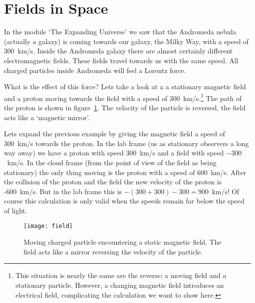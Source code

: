 \section{Fields in Space}
In the module `The Expanding Universe' we saw that the Andromeda nebula (actually a galaxy) is coming towards our galaxy, the Milky Way, with a speed of 300~km/s. Inside the Andromeda galaxy there are almost certainly different electromagnetic fields. These fields travel towards us with the same speed. All charged particles inside Andromeda will feel a Lorentz force.

What is the effect of this force? Lets take a look at a a stationary magnetic field and a proton moving towards the field with a speed of 300~km/s.\footnote{This situation is nearly the same are the reverse; a moving field and a stationary particle. However, a changing magnetic field introduces an electrical field, complicating the calculation we want to show here.} The path of the proton is shown in figure~\ref{fig:field}. The velocity of the particle is reversed, the field acts like a `magnetic mirror'.

Lets expand the previous example by giving the magnetic field a speed of 300~km/s towards the proton. In the lab frame (us as stationary observers a long way away) we have a proton with speed 300~km/s and a field with speed $-300$~km/s. In the cloud frame (from the point of view of the field as being stationary) the only thing moving is the proton with a speed of 600~km/s. After the collision of the proton and the field the new velocity of the proton is -600~km/s. But in the lab frame this is $-(300+300)-300 = 900$~km/s! Of course this calculation is only valid when the speeds remain far below the speed of light.

\begin{figure}\begin{center}
\texttt{[image: field]}%
\caption{Moving charged particle encountering a static magnetic field. The field acts like a mirror reversing the velocity of the particle.}\label{fig:field}
\end{center}\end{figure}

